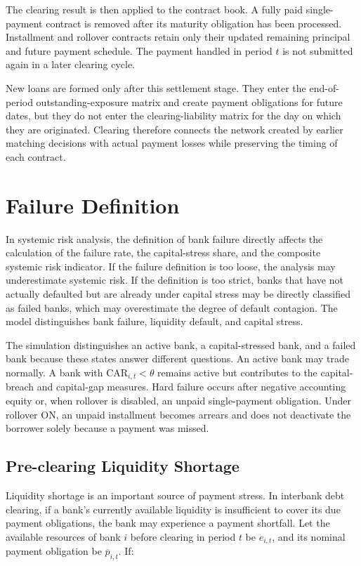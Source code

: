 The clearing result is then applied to the contract book. A fully paid
single-payment contract is removed after its maturity obligation has been processed.
Installment and rollover contracts retain only their updated remaining
principal and future payment schedule. The payment handled in period
\(t\) is not submitted again in a later clearing cycle.

New loans are formed only after this settlement stage. They enter the
end-of-period outstanding-exposure matrix and create payment obligations
for future dates, but they do not enter the clearing-liability matrix
for the day on which they are originated. Clearing therefore connects
the network created by earlier matching decisions with actual payment
losses while preserving the timing of each contract.

\section{Failure Definition}

In systemic risk analysis, the definition of bank failure directly
affects the calculation of the failure rate, the capital-stress share,
and the composite systemic risk indicator. If the failure definition is
too loose, the analysis may underestimate systemic risk. If the
definition is too strict, banks that have not actually defaulted but are
already under capital stress may be directly classified as failed banks,
which may overestimate the degree of default contagion. The model
distinguishes bank failure, liquidity default, and capital stress.

The simulation distinguishes an active bank, a capital-stressed bank,
and a failed bank because these states answer different questions. An
active bank may trade normally. A bank with \(\mathrm{CAR}_{i,t}<\theta\)
remains active but contributes to the capital-breach and capital-gap
measures. Hard failure occurs after negative accounting equity or, when
rollover is disabled, an unpaid single-payment obligation. Under
rollover ON, an unpaid installment becomes arrears and does not
deactivate the borrower solely because a payment was missed.

\subsection{Pre-clearing Liquidity Shortage}

Liquidity shortage is an important source of payment stress. In interbank
debt clearing, if a bank's currently available liquidity is insufficient
to cover its due payment obligations, the bank may experience a payment
shortfall. Let the available resources of bank \(i\) before clearing in
period \(t\) be \(e_{i,t}\), and its nominal payment obligation be
\({\overline{p}}_{i,t}\). If:


